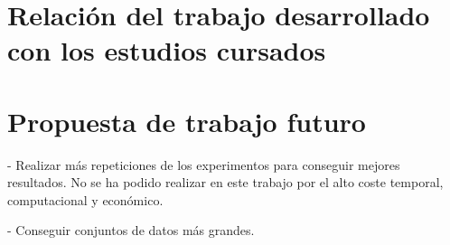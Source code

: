 \documentclass[11pt,spanish,listoffigures,listoftables]{tfgetsinf}
\begin{document}
\section{Relación del trabajo desarrollado con los estudios cursados}

\section{Propuesta de trabajo futuro}

- Realizar más repeticiones de los experimentos para conseguir mejores resultados. No se ha podido realizar en este trabajo por el alto coste temporal, computacional y económico.

- Conseguir conjuntos de datos más grandes.







\cleardoublepage


\APPENDIX



\end{document}
